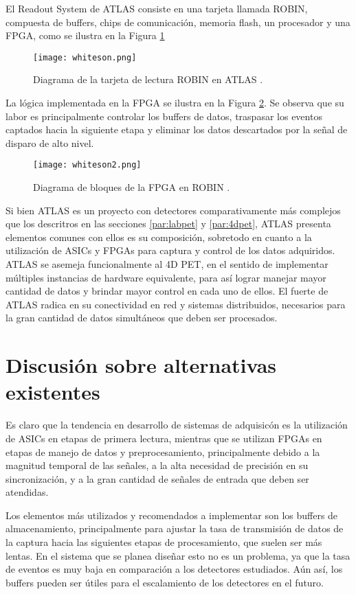 	El Readout System de ATLAS consiste en una tarjeta llamada ROBIN, compuesta de buffers, chips de comunicación, memoria flash, un procesador y una FPGA, como se ilustra en la Figura \ref{fig:whiteson}
	
	\begin{figure}[h]
		\centering
		\texttt{[image: whiteson.png]}
		\caption{Diagrama de la tarjeta de lectura ROBIN en ATLAS \cite{Whiteson2016TheSystem}.}
		\label{fig:whiteson}
	\end{figure}
	
	La lógica implementada en la FPGA se ilustra en la Figura \ref{fig:whiteson2}. Se observa que su labor es principalmente controlar los buffers de datos, traspasar los eventos captados hacia la siguiente etapa y eliminar los datos descartados por la señal de disparo de alto nivel.
	
	\begin{figure}[h]
		\centering
		\texttt{[image: whiteson2.png]}
		\caption{Diagrama de bloques de la FPGA en ROBIN \cite{Whiteson2016TheSystem}.}
		\label{fig:whiteson2}
	\end{figure}
	
	\newpage
	Si bien ATLAS es un proyecto con detectores comparativamente más complejos que los descritros en las secciones \ref{par:labpet} y \ref{par:4dpet}, ATLAS presenta elementos comunes con ellos es su composición, sobretodo en cuanto a la utilización de ASICs y FPGAs para captura y control de los datos adquiridos. ATLAS se asemeja funcionalmente al 4D PET, en el sentido de implementar múltiples instancias de hardware equivalente, para así lograr manejar mayor cantidad de datos y brindar mayor control en cada uno de ellos. El fuerte de ATLAS radica en su conectividad en red y sistemas distribuidos, necesarios para la gran cantidad de datos simultáneos que deben ser procesados.


\section{Discusión sobre alternativas existentes}
	Es claro que la tendencia en desarrollo de sistemas de adquisicón es la utilización de ASICs en etapas de primera lectura, mientras que se utilizan FPGAs en etapas de manejo de datos y preprocesamiento, principalmente debido a la magnitud temporal de las señales, a la alta necesidad de precisión en su sincronización, y a la gran cantidad de señales de entrada que deben ser atendidas.
	
	Los elementos más utilizados y recomendados a implementar son los buffers de almacenamiento, principalmente para ajustar la tasa de transmisión de datos de la captura hacia las siguientes etapas de procesamiento, que suelen ser más lentas. En el sistema que se planea diseñar esto no es un problema, ya que la tasa de eventos es muy baja en comparación a los detectores estudiados. Aún así, los buffers pueden ser útiles para el escalamiento de los detectores en el futuro.
	
